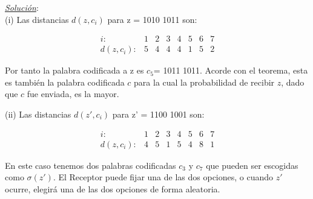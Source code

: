 \documentclass{beamer}
\theoremstyle{plain}
\theoremstyle{example}
\theoremstyle{example}
\begin{document}
\begin{frame}  \small  
\vspace{0.3cm}
\textit{\underline{Solución}}:\\

(i) Las distancias $d(z, c_i)$ para z = 1010 1011 son:

\[
 \begin{array}{lccccccc}
               i:  & 1  & 2  & 3 & 4  & 5  & 6 & 7 \\
        d(z,c_i): & 5  & 4  & 4 & 4  & 1  & 5 & 2 
           \end{array}
           \]

Por tanto la palabra codificada a z es $c_5$= 1011 1011. Acorde con el teorema, esta es también la palabra codificada $c$ para la cual la probabilidad de recibir $z$, dado que $c$ fue enviada, es la mayor.

\vspace{0.3cm}

(ii) Las distancias $d(z', c_i)$ para  z' = 1100 1001 son:

\[
 \begin{array}{lccccccc}
               i:  & 1  & 2  & 3 & 4  & 5  & 6 & 7 \\
        d(z,c_i): & 4  & 5  & 1 & 5  & 4  & 8 & 1 
           \end{array}
           \]

En este caso tenemos dos palabras codificadas $c_3$ y $c_7$ que pueden ser escogidas como $\sigma(z')$. El Receptor puede fijar una de las dos opciones, o cuando $z'$ ocurre, elegirá una de las dos opciones de forma aleatoria.


\end{frame} 
\end{document}
